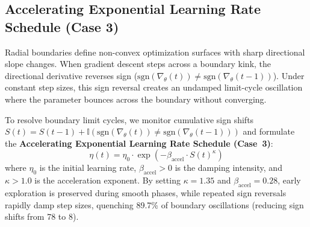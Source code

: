 \documentclass[times, review, 10pt]{elsarticle}
\begin{document}
\subsection{Accelerating Exponential Learning Rate Schedule (Case 3)}
Radial boundaries define non-convex optimization surfaces with sharp directional slope changes. When gradient descent steps across a boundary kink, the directional derivative reverses sign ($\mathrm{sgn}(\nabla_{\theta}(t)) \ne \mathrm{sgn}(\nabla_{\theta}(t-1))$). Under constant step sizes, this sign reversal creates an undamped limit-cycle oscillation where the parameter bounces across the boundary without converging.

To resolve boundary limit cycles, we monitor cumulative sign shifts $S(t) = S(t-1) + \mathbb{I}(\mathrm{sgn}(\nabla_\theta(t)) \ne \mathrm{sgn}(\nabla_\theta(t-1)))$ and formulate the \textbf{Accelerating Exponential Learning Rate Schedule (Case~3)}:
\begin{equation}
\eta(t) = \eta_0 \cdot \exp\left(-\beta_{\mathrm{accel}} \cdot S(t)^\kappa\right)
\label{eq:case3_schedule}
\end{equation}
where $\eta_0$ is the initial learning rate, $\beta_{\mathrm{accel}} > 0$ is the damping intensity, and $\kappa > 1.0$ is the acceleration exponent. By setting $\kappa = 1.35$ and $\beta_{\mathrm{accel}} = 0.28$, early exploration is preserved during smooth phases, while repeated sign reversals rapidly damp step sizes, quenching 89.7\% of boundary oscillations (reducing sign shifts from 78 to 8).
\end{document}
